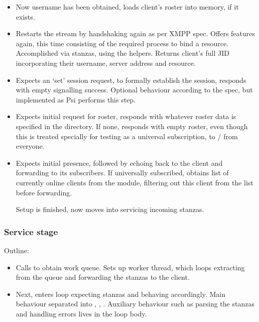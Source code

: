 \documentclass[12pt,a4paper,twoside,openright]{report}
\begin{document}
{\begin{itemize}
  \item Now username has been obtained, loads client's roster into memory, if it exists.

  \item Restarts the stream by handshaking again as per XMPP spec. Offers features again, this time consisting of the required process to bind a resource. Accomplished via  stanzas, using the  helpers. Returns client's full JID incorporating their username, server address and resource.

  \item Expects an  `set' session request, to formally establish the session, responds with empty  signalling success. Optional behaviour according to the spec, but implemented as Psi performs this step.

  \item Expects initial request for roster, responds with whatever roster data is specified in the  directory. If none, responds with empty roster, even though this is treated specially for testing as a universal subscription, to / from everyone.

  \item Expects initial presence, followed by echoing back to the client and forwarding to its subscribers. If universally subscribed, obtains list of currently online clients from the  module, filtering out this client from the list before forwarding.

  Setup is finished, now moves into servicing incoming stanzas.
\end{itemize}

\subsubsection{Service stage}
Outline:

\begin{itemize}
  \item Calls  to obtain work queue. Sets up worker thread, which loops extracting from the queue and forwarding the stanzas to the client.

  \item Next, enters loop expecting stanzas and behaving accordingly. Main behaviour separated into , , . Auxiliary behaviour such as parsing the stanzas and handling errors lives in the loop body.


\end{itemize}}
\end{document}
